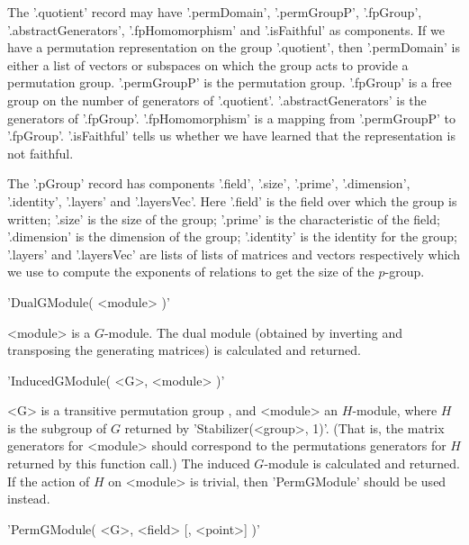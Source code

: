 The '.quotient' record may have '.permDomain', '.permGroupP', '.fpGroup',
'.abstract\-Gen\-erat\-ors',    '.fpHomomorphism'  and  '.isFaithful'  as
components.   If   we have a  permutation   representation  on  the group
'.quotient', then '.permDomain' is either a  list of vectors or subspaces
on which the group acts to provide a permutation group.  '.permGroupP' is
the  permutation  group.  '.fpGroup'  is a  free  group  on the number of
generators  of  '.quotient'.  '.abstractGenerators'  is the generators of
'.fpGroup'.   '.fpHomomorphism'   is   a mapping from   '.permGroupP'  to
'.fpGroup'.   '.isFaithful' tells  us  whether we have  learned  that the
representation is not faithful.

The '.pGroup'  record     has components '.field',  '.size',    '.prime',
'.dimension', '.identity', '.layers'  and '.layersVec'.  Here '.field' is
the field over which  the group is written; '.size'   is the size  of the
group;  '.prime' is the characteristic  of the field; '.dimension' is the
dimension  of  the group;   '.identity' is the   identity  for the group;
'.layers' and '.layersVec'   are lists of  lists of  matrices and vectors
respectively which we  use to compute the  exponents of relations to  get
the size of the $p$-group.


'DualGModule( <module> )'

<module> is  a $G$-module.   The dual module  (obtained  by inverting and
transposing the generating matrices) is calculated and returned.


'InducedGModule( <G>, <module> )'

<G> is a transitive permutation group , and <module> an $H$-module, where
$H$  is the subgroup of  $G$  returned by 'Stabilizer(<group>, 1)'. (That
is,  the  matrix   generators for   <module>  should correspond   to  the
permutations generators  for  $H$ returned by this   function call.)  The
induced $G$-module  is calculated and returned.   If the action of $H$ on
<module> is trivial, then 'PermGModule' should be used instead.



'PermGModule( <G>, <field> [, <point>] )'

